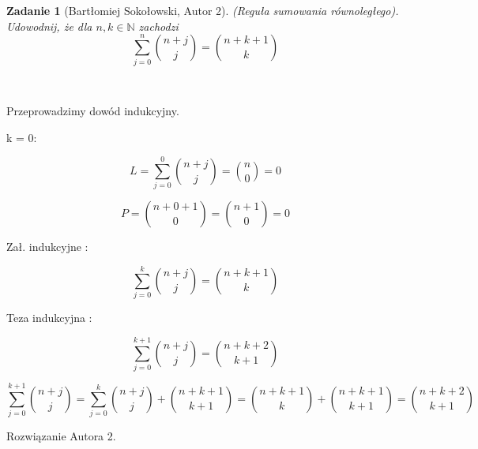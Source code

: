 \documentclass{mwart}
\newtheorem{zad}{Zadanie}[section]
\begin{document}
\begin{zad}[Bartłomiej Sokołowski, Autor 2]
    (Reguła sumowania równoległego). Udowodnij, że dla $n, k \in \mathbb{N}$
    zachodzi \[ \sum_{j= 0}^{n}\binom{n+j}{j} = \binom{n+k+1}{k}   \]
\end{zad}\
\begin{mdframed}
    Przeprowadzimy dowód indukcyjny.
    \item k = 0:
    \item \[ L = \sum_{j=0}^{0}\binom{n+j}{j} = \binom{n}{0} = 0 \]
    \item \[P = \binom{n+0+1}{0} = \binom{n+1}{0} = 0\]
    \item Zał. indukcyjne :
    \item \[\sum_{j=0}^{k}\binom{n+j}{j} = \binom{n+k+1}{k}\]
    \item Teza indukcyjna :
    \item \[\sum_{j=0}^{k+1}\binom{n+j}{j} = \binom{n+k+2}{k+1}\]
    \item \[\sum_{j=0}^{k+1}\binom{n+j}{j} = \sum_{j=0}^{k}\binom{n+j}{j} + \binom{n+k+1}{k+1} = \binom{n+k+1}{k} + \binom{n+k+1}{k+1} = \binom{n+k+2}{k+1}\]
\end{mdframed}
\begin{mdframed}
    Rozwiązanie Autora 2.
\end{mdframed}
\end{document}
